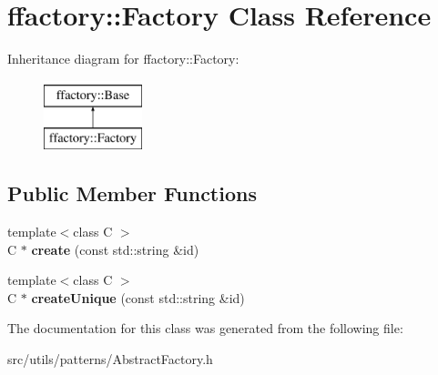 \hypertarget{classffactory_1_1_factory}{\section{ffactory\-:\-:Factory Class Reference}
\label{classffactory_1_1_factory}
}
Inheritance diagram for ffactory\-:\-:Factory\-:\begin{figure}[H]
\begin{center}
\leavevmode
\includegraphics[height=2.000000cm]{classffactory_1_1_factory}
\end{center}
\end{figure}
\subsection*{Public Member Functions}
\begin{DoxyCompactItemize}
\item 
\hypertarget{classffactory_1_1_factory_a9236bfbf74b46f1082696c0d508fbd26}{{\footnotesize template$<$class C $>$ }\\C $\ast$ {\bfseries create} (const std\-::string \&id)}\label{classffactory_1_1_factory_a9236bfbf74b46f1082696c0d508fbd26}

\item 
\hypertarget{classffactory_1_1_factory_adc0f936e2d22ac6327ff62d34032edbc}{{\footnotesize template$<$class C $>$ }\\C $\ast$ {\bfseries create\-Unique} (const std\-::string \&id)}\label{classffactory_1_1_factory_adc0f936e2d22ac6327ff62d34032edbc}

\end{DoxyCompactItemize}


The documentation for this class was generated from the following file\-:\begin{DoxyCompactItemize}
\item 
src/utils/patterns/Abstract\-Factory.\-h\end{DoxyCompactItemize}
